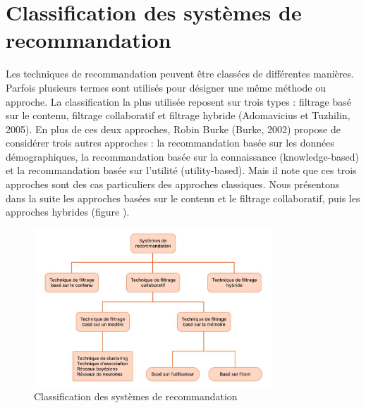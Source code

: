 \documentclass[edit,12pt,a4paper,ChapStyle,oneside,doubleinterligne]{report}
\begin{document}
\section{Classification des systèmes de recommandation}
Les techniques de recommandation peuvent être classées de différentes manières. Parfois
plusieurs termes sont utilisés pour désigner une même méthode ou approche. La classification la
plus utilisée reposent sur trois types : filtrage basé sur le contenu, filtrage collaboratif et filtrage
hybride (Adomavicius et Tuzhilin, 2005). En plus de ces deux approches, Robin Burke
(Burke, 2002) propose de considérer trois autres approches : la recommandation basée sur les
données démographiques, la recommandation basée sur la connaissance (knowledge-based) et la
recommandation basée sur l'utilité (utility-based). Mais il note que ces trois approches sont des cas
particuliers des approches classiques.
Nous présentons dans la suite les approches basées sur le contenu et le filtrage collaboratif, puis les approches hybrides (figure ).
\begin{figure}[H]
    \centering
    \includegraphics[width=0.8\textwidth]{images/classification.jpg}
    \caption{Classification des systèmes de recommandation}\label{class}
\end{figure}
\end{document}
